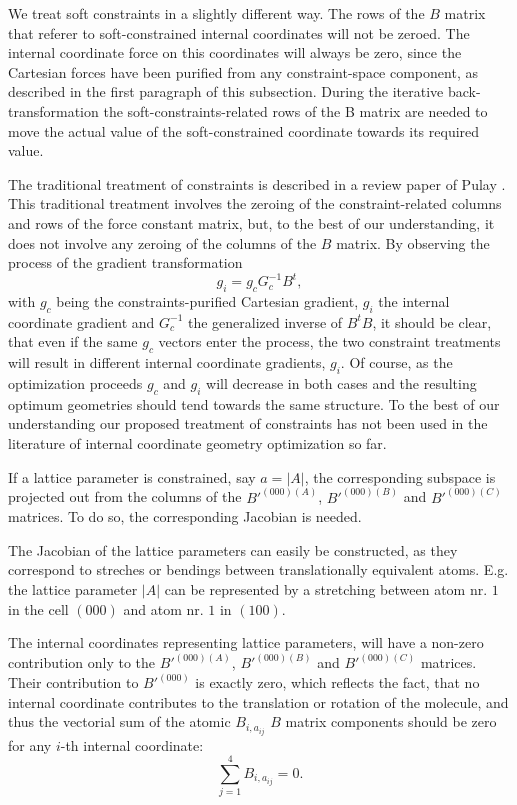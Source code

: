 \documentclass[prl,aps,preprint,superbib,12pt]{revtex4}
\begin{document}
We treat soft constraints in a slightly different way. The rows
of the $B$ matrix that referer to soft-constrained internal coordinates
will not be zeroed. The internal coordinate force on this
coordinates will always be zero, since the Cartesian forces have been
purified from any constraint-space component, as described in the first
paragraph of this subsection. During the iterative back-transformation
the soft-constraints-related rows of the B matrix are needed to 
move the actual value of the soft-constrained coordinate towards
its required value.

The traditional treatment of constraints is described in a review
paper of Pulay \cite{PPulay77}. This traditional treatment
involves the zeroing of the constraint-related columns and rows of the
force constant matrix, but, to the best of our understanding,
it does not involve any zeroing of the columns of the $B$ matrix.
By observing the process of the gradient transformation 
\begin{equation}
g_{i} = g_{c} G_{c}^{-1} B^{t},
\end{equation}
with $g_{c}$ being the constraints-purified Cartesian gradient,
$g_{i}$ the internal coordinate gradient and $G_{c}^{-1}$ 
the generalized inverse of $B^{t}B$, it should be clear,
that even if the same $g_{c}$ vectors enter the process, the two
constraint treatments will result in different internal coordinate 
gradients, $g_{i}$.
Of course, as the optimization proceeds $g_{c}$ and $g_{i}$ will
decrease in both cases and the resulting optimum geometries
should tend towards the same structure.
To the best of our understanding our proposed treatment of constraints
has not been used in the literature of internal coordinate
geometry optimization so far.

If a lattice parameter is constrained, say 
$a=|A|$, the corresponding subspace is projected out from the
columns of the $B'^{(000)(A)}$, $B'^{(000)(B)}$ and $B'^{(000)(C)}$
matrices. To do so, the corresponding Jacobian is needed.

The Jacobian of the lattice parameters can easily be constructed,
as they correspond to streches or bendings between translationally
equivalent atoms. E.g. the lattice parameter $|A|$ can be represented
by a stretching between atom nr. $1$ in the cell $(000)$ and 
atom nr. $1$ in $(100)$. 

The internal coordinates representing
lattice parameters, will have
a non-zero contribution only to the 
$B'^{(000)(A)}$, $B'^{(000)(B)}$ and $B'^{(000)(C)}$
 matrices. Their contribution to $B'^{(000)}$
is exactly zero, which reflects the fact, that no internal
coordinate contributes to the translation or rotation of the
molecule, and thus the vectorial sum of the atomic $B_{i,a_{ij}}$ 
$B$ matrix components should be zero for any $i$-th internal coordinate:
\begin{equation}
\sum_{j=1}^{4} B_{i,a_{ij}} = 0 .
\end{equation}
\end{document}
